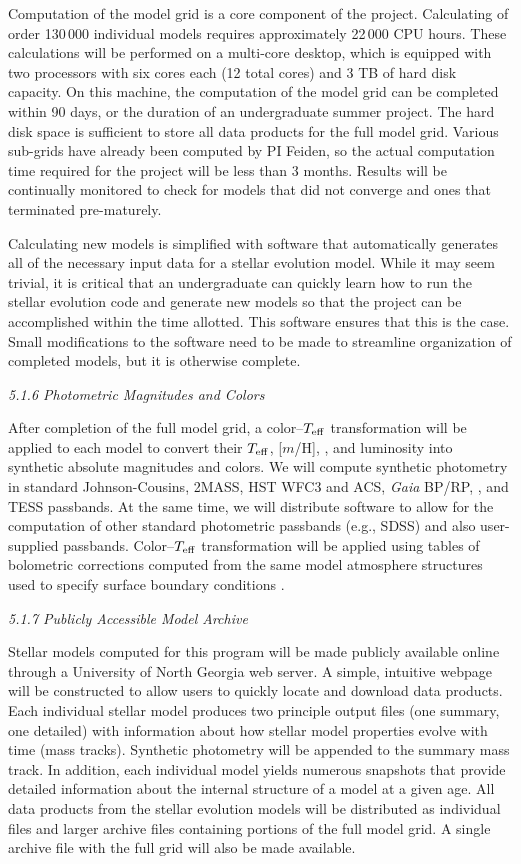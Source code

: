 Computation of the model grid is a core component of the project. Calculating of order 130\,000 individual models requires approximately 22\,000 CPU hours. These calculations will be performed on a multi-core desktop, which is equipped with two processors with six cores each (12 total cores) and 3 TB of hard disk capacity. On this machine, the computation of the model grid can be completed within 90 days, or the duration of an undergraduate summer project. The hard disk space is sufficient to store all data products for the full model grid. Various sub-grids have already been computed by PI Feiden, so the actual computation time required for the project will be less than 3 months. Results will be continually monitored to check for models that did not converge and ones that terminated pre-maturely.

Calculating new models is simplified with software that automatically generates all of the necessary input data for a stellar evolution model. While it may seem trivial, it is critical that an undergraduate can quickly learn how to run the stellar evolution code and generate new models so that the project can be accomplished within the time allotted. This software ensures that this is the case. Small modifications to the software need to be made to streamline organization of completed models, but it is otherwise complete.


{\it 5.1.6 Photometric Magnitudes and Colors}

After completion of the full model grid, a color--$T_{\rm eff}$ transformation will be applied to each model to convert their $T_{\rm eff}$, [$m$/H], \logg, and luminosity into synthetic absolute magnitudes and colors. We will compute synthetic photometry in standard Johnson-Cousins, 2MASS, HST WFC3 and ACS, {\it Gaia} BP/RP, \kepler, and TESS passbands. At the same time, we will distribute software to allow for the computation of other standard photometric passbands (e.g., SDSS) and also user-supplied passbands. Color--$T_{\rm eff}$ transformation will be applied using tables of bolometric corrections computed from the same model atmosphere structures used to specify surface boundary conditions \citep[see above;][]{Allard2011, Gustafsson2008, Castelli2004}.

{\it 5.1.7 Publicly Accessible Model Archive}

Stellar models computed for this program will be made publicly available online through a University of North Georgia web server. A simple, intuitive webpage will be constructed to allow users to quickly locate and download data products. Each individual stellar model produces two principle output files (one summary, one detailed) with information about how stellar model properties evolve with time (mass tracks). Synthetic photometry will be appended to the summary mass track. In addition, each individual model yields numerous snapshots that provide detailed information about the internal structure of a model at a given age. All data products from the stellar evolution models will be distributed as individual files and larger archive files containing portions of the full model grid. A single archive file with the full grid will also be made available.  

